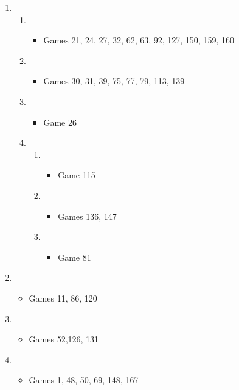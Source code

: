 \begin{enumerate}
\begin{enumerate}
\item \newgame{}
\begin{enumerate}
\item {}
\begin{itemize}
\item Games 21, 24, 27, 32, 62, 63, 92, 127, 150, 159, 160
\end{itemize}
\item {}
\begin{itemize}
\item Games 30, 31, 39, 75, 77, 79, 113, 139
\end{itemize}
\item {}
\begin{itemize}
\item Game 26
\end{itemize}
\item {}
\begin{enumerate}
\item {}
\begin{itemize}
\item Game 115
\end{itemize}
\item {}
\begin{itemize}
\item Games 136, 147
\end{itemize}
\item {}
\begin{itemize}
\item Game 81
\end{itemize}
\end{enumerate}
\end{enumerate}
\item \newgame{}
\begin{itemize}
\item Games 11, 86, 120
\end{itemize}

\item \newgame{}
\begin{itemize}
\item Games 52,126, 131
\end{itemize}

\item \newgame{}
\begin{itemize}
\item Games 1, 48, 50, 69, 148, 167
\end{itemize}


\end{enumerate}
\end{enumerate}
